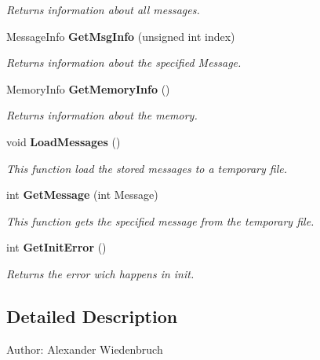 \begin{CompactItemize}
\begin{CompactList}\small\item\em Returns information about all messages. \item\end{CompactList}\item 
Message\-Info {\bf Get\-Msg\-Info} (unsigned int index)\label{classUsrSmp_a8}

\begin{CompactList}\small\item\em Returns information about the specified Message. \item\end{CompactList}\item 
Memory\-Info {\bf Get\-Memory\-Info} ()\label{classUsrSmp_a9}

\begin{CompactList}\small\item\em Returns information about the memory. \item\end{CompactList}\item 
void {\bf Load\-Messages} ()\label{classUsrSmp_a10}

\begin{CompactList}\small\item\em This function load the stored messages to a temporary file. \item\end{CompactList}\item 
int {\bf Get\-Message} (int Message)
\begin{CompactList}\small\item\em This function gets the specified message from the temporary file. \item\end{CompactList}\item 
int {\bf Get\-Init\-Error} ()\label{classUsrSmp_a12}

\begin{CompactList}\small\item\em Returns the error wich happens in init. \item\end{CompactList}\end{CompactItemize}


\subsection{Detailed Description}
\begin{Desc}
\item[Author:]Alexander Wiedenbruch \end{Desc}




